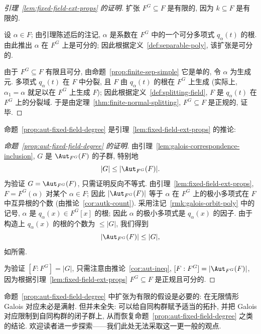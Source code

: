 \begin{proof}[引理~\ref{lem:fixed-field-ext-props} 的证明]
扩张 $F^G\subseteq F$ 是有限的, 因为 $k\subseteq F$ 是有限的.

设 $\alpha\in F$; 由引理陈述后的注记, $\alpha$ 是系数在 $F^G$ 中的一个可分多项式 $q_\alpha(t)$ 的根. 由此推出 $\alpha$ 在 $F^G$ 上是可分的; 因此根据定义~\ref{def:separable-poly}, 该扩张是可分的.

由于 $F^G\subseteq F$ 有限且可分, 由命题~\ref{prop:finite-sep-simple} 它是单的, 令 $\alpha$ 为生成元. 多项式 $q_\alpha(t)$ 在 $F$ 中分裂, 且 $F$ 由 $q_\alpha(t)$ 的根在 $F^G$ 上生成 (实际上, $\alpha_{1}=\alpha$ 就足以在 $F^G$ 上生成 $F$); 因此根据定义~\ref{def:splitting-field}, $F$ 是 $q_\alpha(t)$ 在 $F^G$ 上的分裂域. 于是由定理~\ref{thm:finite-normal-splitting}, $F^G\subseteq F$ 是正规的, 证毕.
\end{proof}

命题~\ref{prop:aut-fixed-field-degree} 是引理~\ref{lem:fixed-field-ext-props} 的推论:

\begin{proof}[命题~\ref{prop:aut-fixed-field-degree} 的证明]
由引理~\ref{lem:galois-correspondence-inclusion}, $G$ 是 $\Aut_{F^G}(F)$ 的子群, 特别地
\[
|G|\leq|\Aut_{F^G}(F)|.
\]
为验证 $G=\Aut_{F^G}(F)$, 只需证明反向不等式. 由引理~\ref{lem:fixed-field-ext-props}, $F=F^G(\alpha)$ 对某个 $\alpha\in F$; 因此 $|\Aut_{F^G}(F)|$ 等于 $\alpha$ 在 $F^G$ 上的极小多项式在 $F$ 中互异根的个数 (由推论~\ref{cor:autk-count}). 采用注记~\ref{rmk:galois-orbit-poly} 中的记号, $\alpha$ 是 $q_\alpha(x)\in F^G[x]$ 的根; 因此 $\alpha$ 的极小多项式是 $q_\alpha(x)$ 的因子. 由于构造上 $q_\alpha(x)$ 的根的个数为 $\leq |G|$, 我们得到
\[
|\Aut_{F^G}(F)|\leq |G|,
\]
如所需.

为验证 $[F:F^G]=|G|$, 只需注意由推论~\ref{cor:aut-ineq}, $[F:F^G]=|\Aut_{F^G}(F)|$, 因为根据引理~\ref{lem:fixed-field-ext-props} $F^G\subseteq F$ 是正规且可分的.
\end{proof}

\begin{remark}\label{rmk:infinite-galois}
命题~\ref{prop:aut-fixed-field-degree} 中扩张为有限的假设是必要的: 在无限情形 Galois 对应未必是满射. 但并未全失: 可以给自同构群赋予适当的拓扑, 并把 Galois 对应限制到自同构群的闭子群上, 从而恢复命题~\ref{prop:aut-fixed-field-degree} 之类的结论. 欢迎读者进一步探索——我们此处无法采取这一更一般的观点.
\end{remark}

